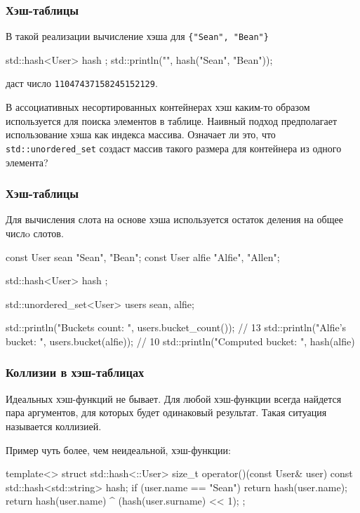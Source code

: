 \documentclass[compress, 8pt]{beamer}
\begin{document}
  \begin{frame}[fragile]

    \frametitle{Хэш-таблицы}

    В такой реализации вычисление хэша для \verb|{"Sean", "Bean"}|

    \begin{mycppinplacelisting}
std::hash<User> hash {};
std::println("{}", hash({"Sean", "Bean"}));
    \end{mycppinplacelisting}

    даст число \texttt{11047437158245152129}.

    \hfill \break
    В ассоциативных несортированных контейнерах хэш каким-то образом
    используется для поиска элементов в таблице.
    Наивный подход предполагает использование хэша как индекса массива.
    Означает ли это, что \texttt{std::unordered\_set} создаст
    массив такого размера для контейнера из одного элемента?

  \end{frame}

  \begin{frame}[fragile]

    \frametitle{Хэш-таблицы}

    Для вычисления слота на основе хэша используется
    остаток деления на общее числo слотов.

    \begin{mycppinplacelisting}
const User sean {"Sean", "Bean"};
const User alfie {"Alfie", "Allen"};

std::hash<User> hash {};

std::unordered_set<User> users {sean, alfie};

std::println("Buckets count: {}", users.bucket_count()); // 13
std::println("Alfie's bucket: {}", users.bucket(alfie)); // 10
std::println("Computed bucket: {}",
  hash(alfie) %
    \end{mycppinplacelisting}

  \end{frame}

  \begin{frame}[fragile]

    \frametitle{Коллизии в хэш-таблицах}

    Идеальных хэш-функций не бывает.
    Для любой хэш-функции всегда найдется пара аргументов,
    для которых будет одинаковый результат.
    Такая ситуация называется коллизией\footnotemark{}.


    \hfill \break
    Пример чуть более, чем неидеальной, хэш-функции:

    \begin{mycppinplacelisting}
template<>
struct std::hash<::User> {
    size_t operator()(const User& user) const {
        std::hash<std::string> hash;
        if (user.name == "Sean") {
            return hash(user.name);
        }
        return hash(user.name) ^ (hash(user.surname) << 1);
    }
};
    \end{mycppinplacelisting}

  \end{frame}
\end{document}
